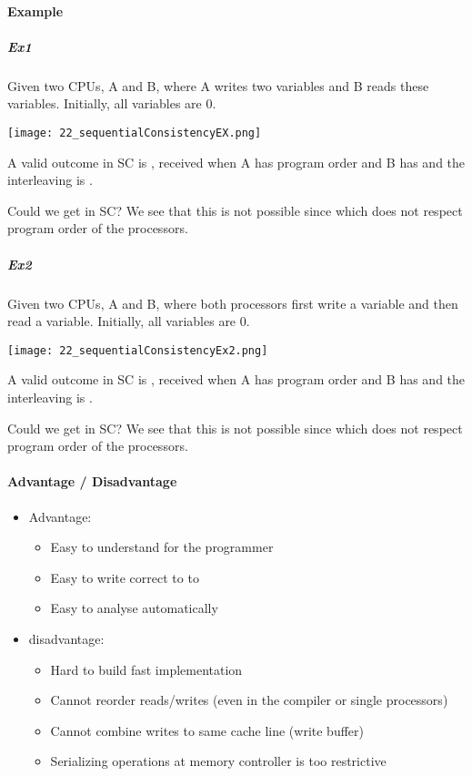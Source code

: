 \paragraph{Example}
\subparagraph{Ex1}
Given two CPUs, A and B, where A writes two variables and B reads these variables. Initially, all variables are $0$.

\texttt{[image: 22\_sequentialConsistencyEX.png]}

A valid outcome in SC is , received when A has program order  and B has  and the interleaving is .

Could we get  in SC? We see that this is not possible since  which does not respect program order of the processors.

\subparagraph{Ex2}
Given two CPUs, A and B, where both processors first write a variable and then read a variable. Initially, all variables are $0$.

\texttt{[image: 22\_sequentialConsistencyEx2.png]}

A valid outcome in SC is , received when A has program order  and B has  and the interleaving is .

Could we get  in SC? We see that this is not possible since  which does not respect program order of the processors.

\paragraph{Advantage / Disadvantage}
\begin{itemize}
    \item Advantage:
        \begin{itemize}
            \item Easy to understand for the programmer
            \item Easy to write correct to to
            \item Easy to analyse automatically
        \end{itemize}
    \item disadvantage:
        \begin{itemize}
            \item Hard to build fast implementation
            \item Cannot reorder reads/writes (even in the compiler or single processors)
            \item Cannot combine writes to same cache line (write buffer)
            \item Serializing operations at memory controller is too restrictive
        \end{itemize}
\end{itemize}


